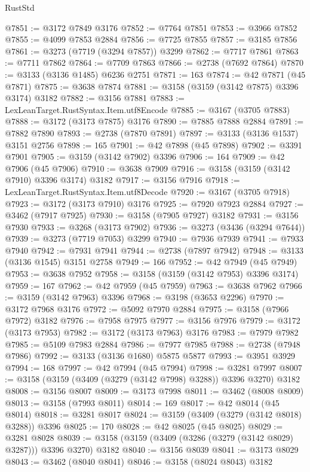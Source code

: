 \begin{lexlean}{RustStd}
\begin{coremodule}
@7851 := @3172 @7849 @3176
@7852 := @7764 @7851
@7853 := @3966 @7852
@7855 := @4099 @7853 @2884
@7856 := @7725 @7855
@7857 := @3185 @7856
@7861 := @3273 (@7719 (@3294 @7857)) @3299
@7862 := @7717 @7861
@7863 := @7711 @7862
@7864 := @7709 @7863
@7866 := @2738 (@7692 @7864)
@7870 := @3133 (@3136 @1485) @6236 @2751
@7871 := 163
@7874 := @42 @7871 (@45 @7871)
@7875 := @3638 @7874
@7881 := @3158 (@3159 (@3142 @7875) @3396 @3174) @3182
@7882 := @3156 @7881
@7883 := LexLeanTarget.RustSyntax.Item.utf8Encode
@7885 := @3167 (@3705 @7883)
@7888 := @3172 (@3173 @7875) @3176
@7890 := @7885 @7888 @2884
@7891 := @7882 @7890
@7893 := @2738 (@7870 @7891)
@7897 := @3133 (@3136 @1537) @3151 @2756
@7898 := 165
@7901 := @42 @7898 (@45 @7898)
@7902 := @3391 @7901
@7905 := @3159 (@3142 @7902) @3396
@7906 := 164
@7909 := @42 @7906 (@45 @7906)
@7910 := @3638 @7909
@7916 := @3158 (@3159 (@3142 @7910) @3396 @3174) @3182
@7917 := @3156 @7916
@7918 := LexLeanTarget.RustSyntax.Item.utf8Decode
@7920 := @3167 (@3705 @7918)
@7923 := @3172 (@3173 @7910) @3176
@7925 := @7920 @7923 @2884
@7927 := @3462 (@7917 @7925)
@7930 := @3158 (@7905 @7927) @3182
@7931 := @3156 @7930
@7933 := @3268 (@3173 @7902)
@7936 := @3273 (@3436 (@3294 @7644))
@7939 := @3273 (@7719 @7053) @3299
@7940 := @7936 @7939
@7941 := @7933 @7940
@7942 := @7931 @7941
@7944 := @2738 (@7897 @7942)
@7948 := @3133 (@3136 @1545) @3151 @2758
@7949 := 166
@7952 := @42 @7949 (@45 @7949)
@7953 := @3638 @7952
@7958 := @3158 (@3159 (@3142 @7953) @3396 @3174)
@7959 := 167
@7962 := @42 @7959 (@45 @7959)
@7963 := @3638 @7962
@7966 := @3159 (@3142 @7963) @3396
@7968 := @3198 (@3653 @2296)
@7970 := @3172 @7968 @3176
@7972 := @5092 @7970 @2884
@7975 := @3158 (@7966 @7972) @3182
@7976 := @7958 @7975
@7977 := @3156 @7976
@7979 := @3172 (@3173 @7953)
@7982 := @3172 (@3173 @7963) @3176
@7983 := @7979 @7982
@7985 := @5109 @7983 @2884
@7986 := @7977 @7985
@7988 := @2738 (@7948 @7986)
@7992 := @3133 (@3136 @1680) @5875 @5877
@7993 := @3951 @3929
@7994 := 168
@7997 := @42 @7994 (@45 @7994)
@7998 := @3281 @7997
@8007 := @3158 (@3159 (@3409 (@3279 (@3142 @7998) @3288)) @3396 @3270) @3182
@8008 := @3156 @8007
@8009 := @3173 @7998
@8011 := @3462 (@8008 @8009)
@8013 := @3158 (@7993 @8011)
@8014 := 169
@8017 := @42 @8014 (@45 @8014)
@8018 := @3281 @8017
@8024 := @3159 (@3409 (@3279 (@3142 @8018) @3288)) @3396
@8025 := 170
@8028 := @42 @8025 (@45 @8025)
@8029 := @3281 @8028
@8039 := @3158 (@3159 (@3409 (@3286 (@3279 (@3142 @8029) @3287))) @3396 @3270) @3182
@8040 := @3156 @8039
@8041 := @3173 @8029
@8043 := @3462 (@8040 @8041)
@8046 := @3158 (@8024 @8043) @3182

\end{coremodule}
\end{lexlean}

